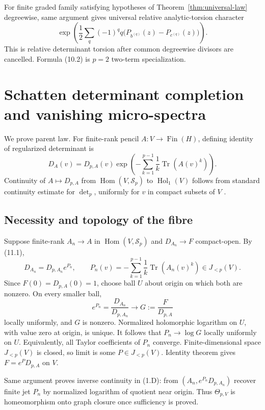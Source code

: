 \documentclass[11pt]{article}
\theoremstyle{definition}
\theoremstyle{remark}
\newcommand{\Tr}{\operatorname{Tr}}
\begin{document}
For finite graded family satisfying hypotheses of Theorem~\ref{thm:universal-law} degreewise,
same argument gives universal relative analytic-torsion character
\[
 \exp\!\left(\frac12\sum_q(-1)^q q
       \bigl(P_{b^{(q)}}(z)-P_{c^{(q)}}(z)\bigr)\right). \tag{10.A}
\]
This is relative determinant torsion after common degreewise divisors are cancelled.  Formula
(10.2) is $p=2$ two-term specialization.

\section{Schatten determinant completion and vanishing micro-spectra}
\label{sec:completion}

We prove parent law.  For finite-rank pencil $A:V\to\operatorname{Fin}(H)$, defining identity
of regularized determinant is
\begin{equation}
 D_A(v)=D_{p,A}(v)
 \exp\!\left(-\sum_{k=1}^{p-1}\frac1k\Tr(A(v)^k)\right).       \tag{11.1}
\end{equation}
Continuity of $A\mapsto D_{p,A}$ from
$\operatorname{Hom}(V,\mathcal S_p)$ to $\operatorname{Hol}_1(V)$ follows from standard
continuity estimate for $\det_p$, uniformly for $v$ in compact subsets of $V$
\cite{Simon2005}.

\subsection*{Necessity and topology of the fibre}

Suppose finite-rank $A_n\to A$ in $\operatorname{Hom}(V,\mathcal S_p)$ and
$D_{A_n}\to F$ compact-open.  By (11.1),
\[
 D_{A_n}=D_{p,A_n}e^{P_n},\qquad
 P_n(v)=-\sum_{k=1}^{p-1}\frac1k\Tr(A_n(v)^k)\in J_{<p}(V).
\]
Since $F(0)=D_{p,A}(0)=1$, choose ball $U$ about origin on which both are nonzero.  On every
smaller ball,
\[
 e^{P_n}=\frac{D_{A_n}}{D_{p,A_n}}\longrightarrow
 G:=\frac{F}{D_{p,A}}
\]
locally uniformly, and $G$ is nonzero.  Normalized holomorphic logarithm on $U$, with value zero
at origin, is unique.  It follows that $P_n\to\log G$ locally uniformly on $U$.  Equivalently,
all Taylor coefficients of $P_n$ converge.  Finite-dimensional space $J_{<p}(V)$ is closed, so
limit is some $P\in J_{<p}(V)$.  Identity theorem gives $F=e^P D_{p,A}$ on $V$.

Same argument proves inverse continuity in (1.D): from $(A_n,e^{P_n}D_{p,A_n})$ recover finite
jet $P_n$ by normalized logarithm of quotient near origin.  Thus $\Theta_{p,V}$ is
homeomorphism onto graph closure once sufficiency is proved.
\end{document}

